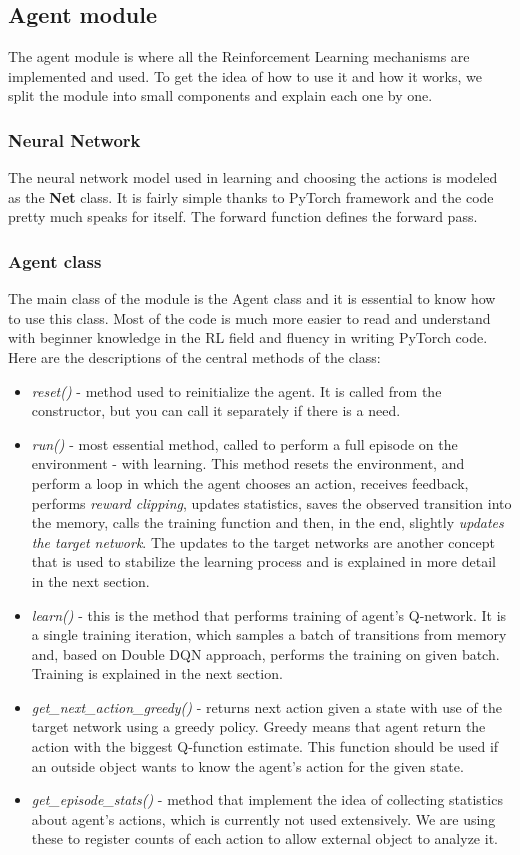 \documentclass{article}
\begin{document}
\subsection{Agent module}
The agent module is where all the Reinforcement Learning mechanisms are implemented and used. To get the idea of how to use it and how it works, we split the module into small components and explain each one by one.
\subsubsection{Neural Network}
The neural network model used in learning and choosing the actions is modeled as the \textbf{Net} class. It is fairly simple thanks to PyTorch framework and the code pretty much speaks for itself. The forward function defines the forward pass.

\subsubsection{Agent class}
The main class of the module is the Agent class and it is essential to know how to use this class. Most of the code is much more easier to read and understand with beginner knowledge in the RL field and fluency in writing PyTorch code. Here are the descriptions of the central methods of the class:

\begin{itemize}
\item \textit{reset()} - method used to reinitialize the agent. It is called from the constructor, but you can call it separately if there is a need.
\item \textit{run()} - most essential method, called to perform a full episode on the environment - with learning. This method resets the environment, and perform a loop in which the agent chooses an action, receives feedback, performs \textit{reward clipping}, updates statistics, saves the observed transition into the memory, calls the training function and then, in the end, slightly \textit{updates the target network}. The updates to the target networks are another concept that is used to stabilize the learning process and is explained in more detail in the next section.
\item \textit{learn()} - this is the method that performs training of agent's Q-network. It is a single training iteration, which samples a batch of transitions from memory and, based on Double DQN approach, performs the training on given batch. Training is explained in the next section. 
\item \textit{get\_next\_action\_greedy()} - returns next action given a state with use of the target network using a greedy policy. Greedy means that agent return the action with the biggest Q-function estimate. This function should be used if an outside object wants to know the agent's action for the given state.
\item \textit{get\_episode\_stats()} - method that implement the idea of collecting statistics about agent's actions, which is currently not used extensively. We are using these to register counts of each action to allow external object to analyze it.
\end{itemize}
\end{document}
